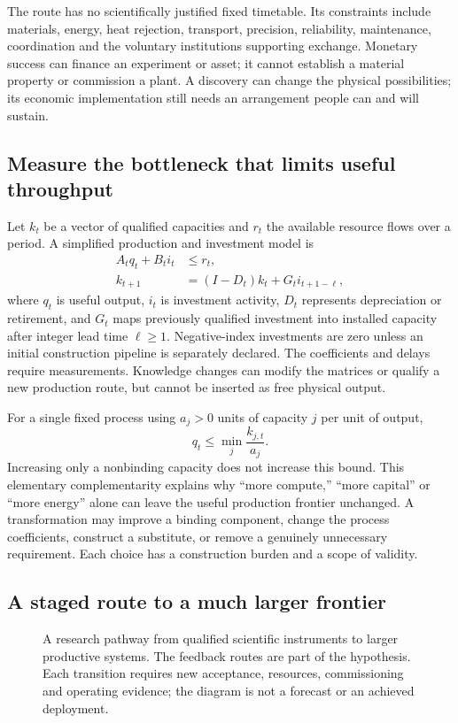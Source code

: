 \documentclass[11pt,letterpaper]{article}
\begin{document}
The route has no scientifically justified fixed timetable. Its constraints include materials, energy, heat rejection, transport, precision, reliability, maintenance, coordination and the voluntary institutions supporting exchange. Monetary success can finance an experiment or asset; it cannot establish a material property or commission a plant. A discovery can change the physical possibilities; its economic implementation still needs an arrangement people can and will sustain.

\subsection{Measure the bottleneck that limits useful throughput}
Let $k_t$ be a vector of qualified capacities and $r_t$ the available resource flows over a period. A simplified production and investment model is
\begin{align}
A_t q_t+B_t i_t &\le r_t,\\
k_{t+1}&=(I-D_t)k_t+G_t i_{t+1-\ell},
\end{align}
where $q_t$ is useful output, $i_t$ is investment activity, $D_t$ represents depreciation or retirement, and $G_t$ maps previously qualified investment into installed capacity after integer lead time $\ell\ge1$. Negative-index investments are zero unless an initial construction pipeline is separately declared. The coefficients and delays require measurements. Knowledge changes can modify the matrices or qualify a new production route, but cannot be inserted as free physical output.

For a single fixed process using $a_j>0$ units of capacity $j$ per unit of output,
\begin{equation}
q_t\le \min_j \frac{k_{j,t}}{a_j}.
\end{equation}
Increasing only a nonbinding capacity does not increase this bound. This elementary complementarity explains why ``more compute,'' ``more capital'' or ``more energy'' alone can leave the useful production frontier unchanged. A transformation may improve a binding component, change the process coefficients, construct a substitute, or remove a genuinely unnecessary requirement. Each choice has a construction burden and a scope of validity.

\subsection{A staged route to a much larger frontier}
\begin{figure}[htbp]\centering
\caption{A research pathway from qualified scientific instruments to larger productive systems. The feedback routes are part of the hypothesis. Each transition requires new acceptance, resources, commissioning and operating evidence; the diagram is not a forecast or an achieved deployment.}\label{fig:physical}
\end{figure}
\end{document}
